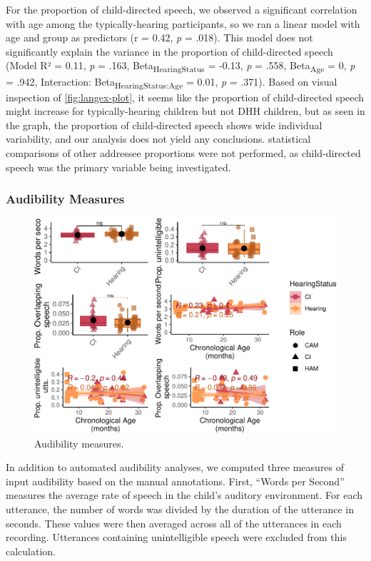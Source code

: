 \documentclass[
  man,floatsintext]{apa6}
\begin{document}
For the proportion of child-directed speech, we observed a significant correlation with age among the typically-hearing participants, so we ran a linear model with age and group as predictors (r = 0.42, \emph{p} = .018). This model does not significantly explain the variance in the proportion of child-directed speech (Model R² = 0.11, \emph{p} = .163, Beta\textsubscript{HearingStatus} = -0.13, \emph{p} = .558, Beta\textsubscript{Age} = 0, \emph{p} = .942, Interaction: Beta\textsubscript{HearingStatus:Age} = 0.01, \emph{p} = .371). Based on visual inspection of \ref{fig:langex-plot}, it seems like the proportion of child-directed speech might increase for typically-hearing children but not DHH children, but as seen in the graph, the proportion of child-directed speech shows wide individual variability, and our analysis does not yield any conclusions. statistical comparisons of other addressee proportions were not performed, as child-directed speech was the primary variable being investigated.

\subsubsection{Audibility Measures}\label{audibility-measures}

\begin{figure}
\centering
\includegraphics{DHH_Input_files/figure-latex/audibility-plot-1.pdf}
\caption{\label{fig:audibility-plot}Audibility measures.}
\end{figure}

In addition to automated audibility analyses, we computed three measures of input audibility based on the manual annotations. First, ``Words per Second'' measures the average rate of speech in the child's auditory environment. For each utterance, the number of words was divided by the duration of the utterance in seconds. These values were then averaged across all of the utterances in each recording. Utterances containing unintelligible speech were excluded from this calculation.
\end{document}
